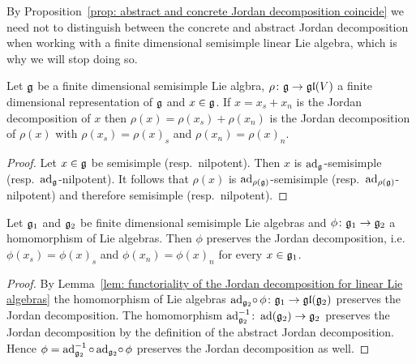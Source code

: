 \begin{rem}
 By Proposition~\ref{prop: abstract and concrete Jordan decomposition coincide} we need not to distinguish between the concrete and abstract Jordan decomposition when working with a finite dimensional semisimple linear Lie algebra, which is why we will stop doing so.
\end{rem}




\begin{lem}\label{lem: functoriality of the Jordan decomposition for linear Lie algebras}
 Let $\mathfrak{g}$ be a finite dimensional semisimple Lie algbra, $\rho \colon \mathfrak{g} \to \mathfrak{gl}(V)$ a finite dimensional representation of $\mathfrak{g}$ and $x \in \mathfrak{g}$. If $x = x_s + x_n$ is the Jordan decomposition of $x$ then $\rho(x) = \rho(x_s) + \rho(x_n)$ is the Jordan decomposition of $\rho(x)$ with $\rho(x_s) = \rho(x)_s$ and $\rho(x_n) = \rho(x)_n$.
\end{lem}
\begin{proof}
 Let $x \in \mathfrak{g}$ be semisimple (resp.\ nilpotent). Then $x$ is $\operatorname{ad}_{\mathfrak{g}}$-semisimple (resp.\ $\operatorname{ad}_{\mathfrak{g}}$-nilpotent). It follows that $\rho(x)$ is $\operatorname{ad}_{\rho(\mathfrak{g})}$-semisimple (resp.\ $\operatorname{ad}_{\rho(\mathfrak{g})}$-nilpotent) and therefore semisimple (resp.\ nilpotent).
\end{proof}


\begin{cor} \label{cor: functoriality of the Jordan decomposition}
 Let $\mathfrak{g}_1$ and $\mathfrak{g}_2$ be finite dimensional semisimple Lie algebras and $\phi \colon \mathfrak{g}_1 \to \mathfrak{g}_2$ a homomorphism of Lie algebras. Then $\phi$ preserves the Jordan decomposition, i.e.\ $\phi(x_s) = \phi(x)_s$ and $\phi(x_n) = \phi(x)_n$ for every $x \in \mathfrak{g}_1$.
\end{cor}
\begin{proof}
 By Lemma~\ref{lem: functoriality of the Jordan decomposition for linear Lie algebras} the homomorphism of Lie algebras $\operatorname{ad}_{\mathfrak{g}_2} \!\circ\, \phi \colon \mathfrak{g}_1 \to \mathfrak{gl}(\mathfrak{g}_2)$ preserves the Jordan decomposition. The homomorphism $\operatorname{ad}_{\mathfrak{g}_2}^{-1} \colon \operatorname{ad}(\mathfrak{g}_2) \to \mathfrak{g}_2$ preserves the Jordan decomposition by the definition of the abstract Jordan decomposition. Hence $\phi = \operatorname{ad}_{\mathfrak{g}_2}^{-1} \circ \operatorname{ad}_{\mathfrak{g}_2}\! \circ\, \phi$ preserves the Jordan decomposition as well.
\end{proof}






















